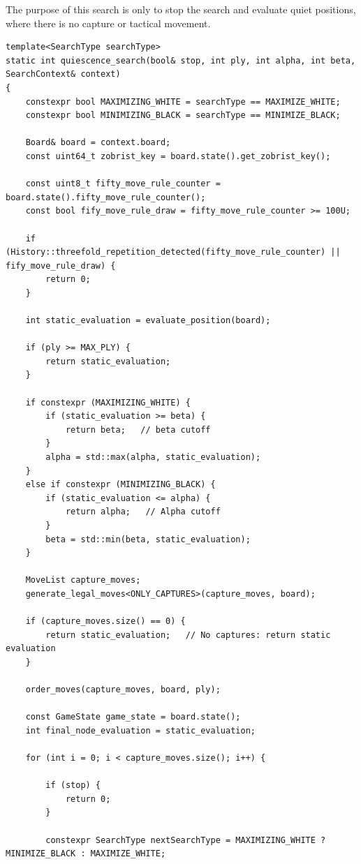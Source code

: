 \noindent The purpose of this search is only to stop the search and evaluate quiet positions, where there is no capture or tactical movement.

\vspace{1em}

\begin{lstlisting}[breaklines=true, frame=single, caption={Quiescence search implementation.}]
template<SearchType searchType>
static int quiescence_search(bool& stop, int ply, int alpha, int beta, SearchContext& context)
{
    constexpr bool MAXIMIZING_WHITE = searchType == MAXIMIZE_WHITE;
    constexpr bool MINIMIZING_BLACK = searchType == MINIMIZE_BLACK;

    Board& board = context.board;
    const uint64_t zobrist_key = board.state().get_zobrist_key();

    const uint8_t fifty_move_rule_counter = board.state().fifty_move_rule_counter();
    const bool fify_move_rule_draw = fifty_move_rule_counter >= 100U;

    if (History::threefold_repetition_detected(fifty_move_rule_counter) || fify_move_rule_draw) {
        return 0;
    }

    int static_evaluation = evaluate_position(board);

    if (ply >= MAX_PLY) {
        return static_evaluation;
    }

    if constexpr (MAXIMIZING_WHITE) {
        if (static_evaluation >= beta) {
            return beta;   // beta cutoff
        }
        alpha = std::max(alpha, static_evaluation);
    }
    else if constexpr (MINIMIZING_BLACK) {
        if (static_evaluation <= alpha) {
            return alpha;   // Alpha cutoff
        }
        beta = std::min(beta, static_evaluation);
    }

    MoveList capture_moves;
    generate_legal_moves<ONLY_CAPTURES>(capture_moves, board);

    if (capture_moves.size() == 0) {
        return static_evaluation;   // No captures: return static evaluation
    }

    order_moves(capture_moves, board, ply);

    const GameState game_state = board.state();
    int final_node_evaluation = static_evaluation;

    for (int i = 0; i < capture_moves.size(); i++) {

        if (stop) {
            return 0;
        }

        constexpr SearchType nextSearchType = MAXIMIZING_WHITE ? MINIMIZE_BLACK : MAXIMIZE_WHITE;


\end{lstlisting}
